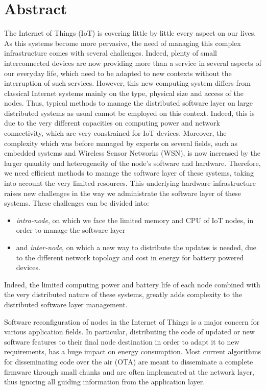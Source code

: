 \chapter*{Abstract}
The Internet of Things (IoT) is covering little by little every aspect on our lives.
As this systems become more pervasive, the need of managing this complex infrastructure comes with several challenges.
Indeed, plenty of small interconnected devices are now providing more than a service in several aspects of our everyday life, which need to be adapted to new contexts without the interruption of such services.
However, this new computing system differs from classical Internet systems mainly on the type, physical size and access of the nodes.
Thus, typical methods to manage the distributed software layer on large distributed systems as usual cannot be employed on this context.
Indeed, this is due to the very different capacities on computing power and network connectivity, which are very constrained for IoT devices.
Moreover, the complexity which was before managed by experts on several fields, such as embedded systems and Wireless Sensor Networks (WSN), is now increased by the larger quantity and heterogeneity of the node's software and hardware.
Therefore, we need efficient methods to manage the software layer of these systems, taking into account the very limited resources.
This underlying hardware infrastructure raises new challenges in the way we administrate the software layer of these systems.
These challenges can be divided into:
\begin{itemize}
	\item \textit{intra-node}, on which we face the limited memory and CPU of IoT nodes, in order to manage the software layer
	\item and \textit{inter-node}, on which a new way to distribute the updates is needed, due to the different network topology and cost in energy for battery powered devices.
\end{itemize} 

Indeed, the limited computing power and battery life of each node combined with the very distributed nature of these systems, greatly adds complexity to the distributed software layer management.

Software reconfiguration of nodes in the Internet of Things is a major concern for various application fields.
In particular, distributing the code of updated or new software features to their final node destination in order to adapt it to new requirements, has a huge impact on energy consumption.
Most current algorithms for disseminating code over the air (OTA) are meant to disseminate a complete firmware through small chunks  and are often implemented at the network layer, thus ignoring all guiding information from the application layer.

